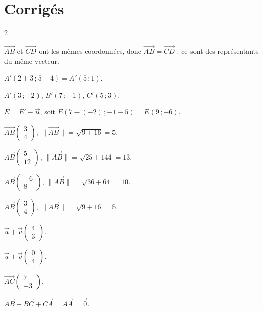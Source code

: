 \section{Corrigés}
\begin{multicols}{2}

$\vec{AB}$ et $\vec{CD}$ ont les mêmes coordonnées, donc $\vec{AB}=\vec{CD}$ : ce sont des
représentants du même vecteur.

$A'(2+3\,;5-4)=A'(5\,;1)$.

$A'(3\,;-2)$, $B'(7\,;-1)$, $C'(5\,;3)$.

$E=E'-\vec u$, soit $E(7-(-2)\,;-1-5)=E(9\,;-6)$.

$\vec{AB}\begin{pmatrix}3\\4\end{pmatrix}$, $\|\vec{AB}\|=\sqrt{9+16}=5$.

$\vec{AB}\begin{pmatrix}5\\12\end{pmatrix}$, $\|\vec{AB}\|=\sqrt{25+144}=13$.

$\vec{AB}\begin{pmatrix}-6\\8\end{pmatrix}$, $\|\vec{AB}\|=\sqrt{36+64}=10$.

$\vec{AB}\begin{pmatrix}3\\4\end{pmatrix}$, $\|\vec{AB}\|=\sqrt{9+16}=5$.

$\vec u+\vec v\begin{pmatrix}4\\3\end{pmatrix}$.

$\vec u+\vec v\begin{pmatrix}0\\4\end{pmatrix}$.

$\vec{AC}\begin{pmatrix}7\\-3\end{pmatrix}$.

$\vec{AB}+\vec{BC}+\vec{CA}=\vec{AA}=\vec0$.


\end{multicols}
